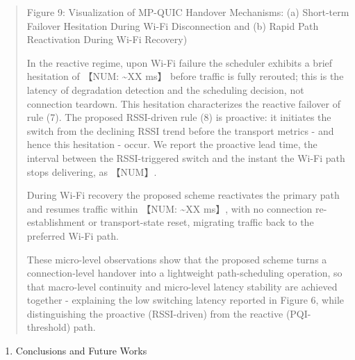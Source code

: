 \begin{quote}
Figure 9: Visualization of MP-QUIC Handover Mechanisms: (a) Short-term Failover Hesitation During Wi-Fi Disconnection and (b) Rapid Path Reactivation During Wi-Fi Recovery)

In the reactive regime, upon Wi-Fi failure the scheduler exhibits a brief hesitation of 【NUM: \textasciitilde XX ms】 before traffic is fully rerouted; this is the latency of degradation detection and the scheduling decision, not connection teardown. This hesitation characterizes the reactive failover of rule (7). The proposed RSSI-driven rule (8) is proactive: it initiates the switch from the declining RSSI trend before the transport metrics - and hence this hesitation - occur. We report the proactive lead time, the interval between the RSSI-triggered switch and the instant the Wi-Fi path stops delivering, as 【NUM】.

During Wi-Fi recovery the proposed scheme reactivates the primary path and resumes traffic within 【NUM: \textasciitilde XX ms】, with no connection re-establishment or transport-state reset, migrating traffic back to the preferred Wi-Fi path.

These micro-level observations show that the proposed scheme turns a connection-level handover into a lightweight path-scheduling operation, so that macro-level continuity and micro-level latency stability are achieved together - explaining the low switching latency reported in Figure 6, while distinguishing the proactive (RSSI-driven) from the reactive (PQI-threshold) path.
\end{quote}

\begin{enumerate}
\def\labelenumi{\arabic{enumi}.}
\setcounter{enumi}{4}
\item
  Conclusions and Future Works
\end{enumerate}

